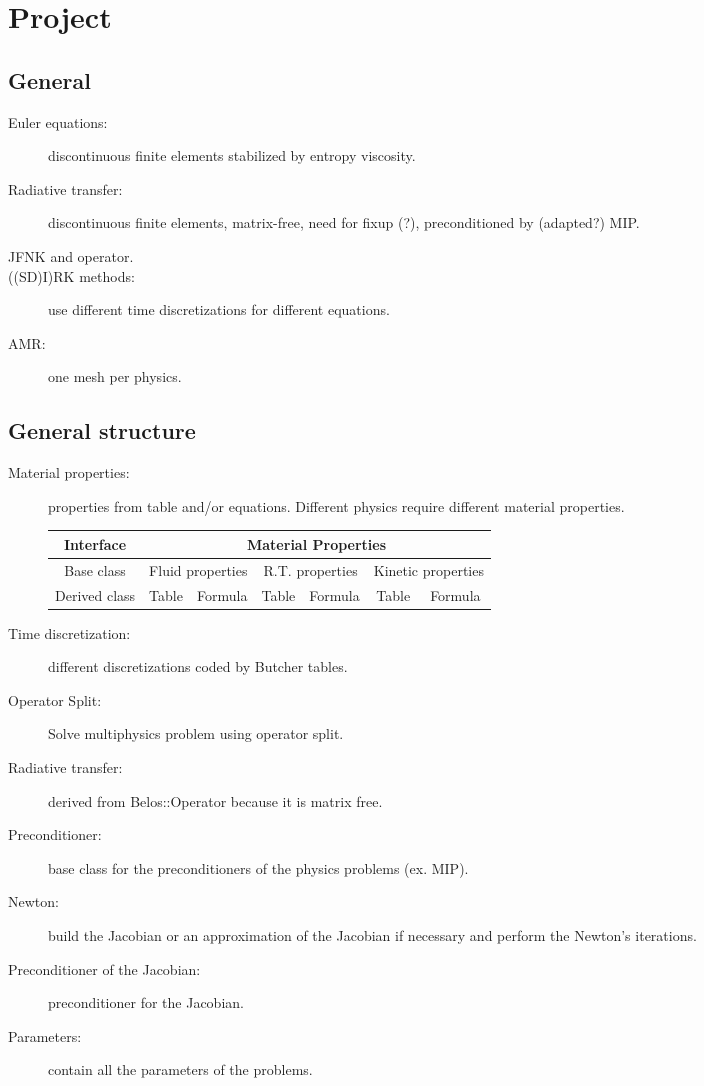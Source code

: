 \chapter{Project}
\section{General}
\begin{description}
  \item[Euler equations:] discontinuous finite elements stabilized by entropy
    viscosity.
  \item[Radiative transfer:] discontinuous finite elements, matrix-free,
    need for fixup (?), preconditioned by (adapted?) MIP.
  \item[JFNK and operator.]
  \item[((SD)I)RK methods:] use different time discretizations for different
    equations.
  \item[AMR:] one mesh per physics.
\end{description}

\section{General structure}
\begin{description}
  \item[Material properties:] properties from table and/or equations.
    Different physics require different material properties.
    \begin{table}[H]
      \centering
      \begin{tabular}{|c|c|c|c|c|c|c|}
        \hline
        Interface & \multicolumn{6}{c|}{Material Properties} \\
        \hline
        Base class & \multicolumn{2}{c|}{Fluid properties} &
      \multicolumn{2}{c|}{R.T. properties} & \multicolumn{2}{c|}{Kinetic properties}
        \\
        \hline
        Derived class & Table & Formula & Table & Formula & Table & Formula \\
        \hline
      \end{tabular}
    \end{table}
  \item[Time discretization:] different discretizations coded by Butcher
    tables.
  \item[Operator Split:] Solve multiphysics problem using operator split.
  \item[Radiative transfer:] derived from Belos::Operator because it is matrix
    free.
  \item[Preconditioner:] base class for the preconditioners of the physics
    problems (ex. MIP).
  \item[Newton:] build the Jacobian or an approximation of the Jacobian if
    necessary and perform the Newton's iterations.
  \item[Preconditioner of the Jacobian:] preconditioner for the Jacobian.
  \item[Parameters:] contain all the parameters of the problems.
\end{description}

